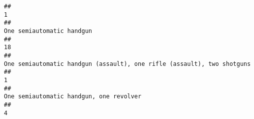 \documentclass[
]{article}
\begin{document}
\begin{verbatim}
##                                                                                                                                                                                                                                                                                                                                                                                                     1 
##                                                                                                                                                                                                                                                                                                                                                                             One semiautomatic handgun 
##                                                                                                                                                                                                                                                                                                                                                                                                    18 
##                                                                                                                                                                                                                                                                                                                                One semiautomatic handgun (assault), one rifle (assault), two shotguns 
##                                                                                                                                                                                                                                                                                                                                                                                                     1 
##                                                                                                                                                                                                                                                                                                                                                               One semiautomatic handgun, one revolver 
##                                                                                                                                                                                                                                                                                                                                                                                                     4 

\end{verbatim}
\end{document}
